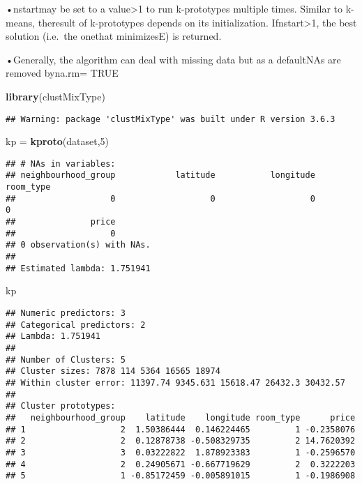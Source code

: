 \documentclass[
]{article}
\newenvironment{Shaded}{\begin{snugshade}}{\end{snugshade}}
\newcommand{\DecValTok}[1]{\textcolor[rgb]{0.00,0.00,0.81}{#1}}
\newcommand{\KeywordTok}[1]{\textcolor[rgb]{0.13,0.29,0.53}{\textbf{#1}}}
\newcommand{\NormalTok}[1]{#1}
\newcommand{\StringTok}[1]{\textcolor[rgb]{0.31,0.60,0.02}{#1}}
\begin{document}
•nstartmay be set to a value\textgreater1 to run k-prototypes multiple
times. Similar to k-means, theresult of k-prototypes depends on its
initialization. Ifnstart\textgreater1, the best solution (i.e.~the
onethat minimizesE) is returned.

•Generally, the algorithm can deal with missing data but as a defaultNAs
are removed byna.rm= TRUE

\begin{Shaded}
\begin{Highlighting}[]
\KeywordTok{library}\NormalTok{(clustMixType)}
\end{Highlighting}
\end{Shaded}

\begin{verbatim}
## Warning: package 'clustMixType' was built under R version 3.6.3
\end{verbatim}

\begin{Shaded}
\begin{Highlighting}[]
\NormalTok{kp =}\StringTok{ }\KeywordTok{kproto}\NormalTok{(dataset,}\DecValTok{5}\NormalTok{)}
\end{Highlighting}
\end{Shaded}

\begin{verbatim}
## # NAs in variables:
## neighbourhood_group            latitude           longitude           room_type 
##                   0                   0                   0                   0 
##               price 
##                   0 
## 0 observation(s) with NAs.
## 
## Estimated lambda: 1.751941
\end{verbatim}

\begin{Shaded}
\begin{Highlighting}[]
\NormalTok{kp }
\end{Highlighting}
\end{Shaded}

\begin{verbatim}
## Numeric predictors: 3 
## Categorical predictors: 2 
## Lambda: 1.751941 
## 
## Number of Clusters: 5 
## Cluster sizes: 7878 114 5364 16565 18974 
## Within cluster error: 11397.74 9345.631 15618.47 26432.3 30432.57 
## 
## Cluster prototypes:
##   neighbourhood_group    latitude    longitude room_type      price
## 1                   2  1.50386444  0.146224465         1 -0.2358076
## 2                   2  0.12878738 -0.508329735         2 14.7620392
## 3                   3  0.03222822  1.878923383         1 -0.2596570
## 4                   2  0.24905671 -0.667719629         2  0.3222203
## 5                   1 -0.85172459 -0.005891015         1 -0.1986908
\end{verbatim}
\end{document}
